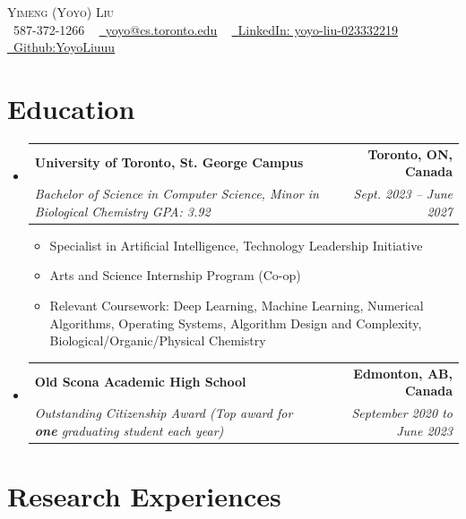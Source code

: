 \documentclass[letterpaper,11pt]{article}
\makeatletter
\newcommand{\resumeItem}[1]{
  \item\small{
    {#1 \vspace{-2pt}}
  }
}
\newcommand{\resumeSubheading}[4]{
  \vspace{6pt}\item   
    \begin{tabular*}{1.0\textwidth}[t]{l@{\extracolsep{\fill}}r}
      \textbf{#1} & \textbf{\small #2} \\
      \textit{\small#3} & \textit{\small #4} \\
    \end{tabular*}\vspace{-3pt}
}
\newcommand{\resumeSubHeadingListStart}{\begin{itemize}[leftmargin=0.0in, label={}]}
\newcommand{\resumeSubHeadingListEnd}{\end{itemize}}
\newcommand{\resumeItemListStart}{\begin{itemize}}
\newcommand{\resumeItemListEnd}{\end{itemize}\vspace{-5pt}}
\makeatother
\begin{document}

\begin{center}
    {\Huge \scshape Yimeng (Yoyo) Liu} \\ 
\raisebox{-0.1\height}\faPhone\ 587-372-1266 ~ \href{mailto:yoyoyimeng.liu@mail.utoronto.ca}{\raisebox{-0.2\height}\faEnvelope\  \underline{yoyo@cs.toronto.edu}} ~ 
    \href{https://www.linkedin.com/in/yoyo-liu-023332219/}{\raisebox{-0.2\height}\faLinkedin\ \underline{LinkedIn: yoyo-liu-023332219}}  ~
    \href{https://github.com/YoyoLiuuu}{\raisebox{-0.2\height}\ \underline{Github:YoyoLiuuu}}  ~
\end{center}
\section{Education}
  \resumeSubHeadingListStart
    \resumeSubheading
      {University of Toronto, St. George Campus}{Toronto, ON, Canada}
      {Bachelor of Science in Computer Science, Minor in Biological Chemistry \quad GPA: 3.92}{Sept. 2023 -- June 2027}
      \resumeItemListStart
        \resumeItem{Specialist in Artificial Intelligence, Technology Leadership Initiative}
        \resumeItem{Arts and Science Internship Program (Co-op)}
        \resumeItem{Relevant Coursework: Deep Learning, Machine Learning, Numerical Algorithms, Operating Systems, Algorithm Design and Complexity, Biological/Organic/Physical Chemistry}
      \resumeItemListEnd
    \resumeSubheading
      {Old Scona Academic High School}{Edmonton, AB, Canada} 
      {Outstanding Citizenship Award (Top award for \textbf{one} graduating student each year)}{September 2020 to June 2023}
  \resumeSubHeadingListEnd
        
\section{Research Experiences}
\end{document}
